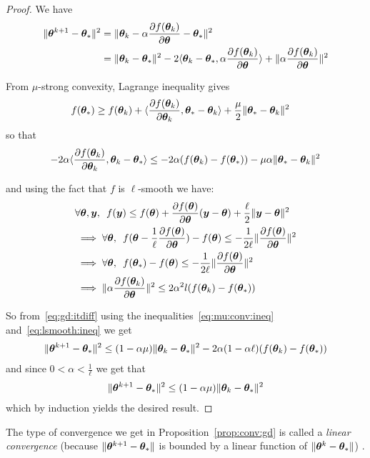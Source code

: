 \begin{proof}
  We have 
  \begin{align}
    \| \thetab^{k+1} - \thetab_* \|^2 &= \| \thetab_k -\alpha \partialfrac{\thetab}{f(\thetab_k)} - \thetab_* \|^2 \\
                            &= \| \thetab_k - \thetab_* \|^2  - 2 \dotp{ \thetab_k - \thetab_* }{ \alpha \partialfrac{\thetab}{f(\thetab_k)} } + \|\alpha \partialfrac{\thetab}{f(\thetab_k)} \|^2  \label{eq:gd:itdiff}
 \end{align}

 From $\mu$-strong convexity, Lagrange inequality gives
 \begin{align}
   &f(\thetab_*) \geq f(\thetab_k) + \dotp{ \partialfrac{\thetab_k}{f(\thetab_k)} }{ \thetab_* - \thetab_k } + \frac{\mu}{2} \|\thetab_* - \thetab_k \|^2
 \end{align}
 so that 
 \begin{align}
   -2 \alpha \dotp{ \partialfrac{\thetab_k}{f(\thetab_k)} }{ \thetab_k -  \thetab_*} \leq  -2 \alpha(f(\thetab_k) - f(\thetab_*)) - \mu \alpha \|\thetab_* - \thetab_k \|^2 \label{eq:mu:conv:ineq}
   \end{align}

   and using the fact that $f$ is $\ell$-smooth we have: 
   \begin{align}
     &\forall \thetab, \yb, \enspace f(\yb) \leq f(\thetab) + \partialfrac{\thetab}{f(\thetab)} (\yb - \thetab) + \frac{\ell}{2} \| \yb - \thetab \|^2 \\
     &\implies \forall \thetab, \enspace f(\thetab - \frac1{\ell} \partialfrac{\thetab}{f(\thetab)}) - f(\thetab) \leq -\frac1{2\ell} \| \partialfrac{\thetab}{f(\thetab)} \|^2 \\
     &\implies \forall \thetab, \enspace f(\thetab_*) - f(\thetab) \leq -\frac1{2\ell} \| \partialfrac{\thetab}{f(\thetab)} \|^2  \\
     &\implies \|\alpha \partialfrac{\thetab}{f(\thetab_k)} \|^2 \leq 2\alpha^2 l(f(\thetab_k) - f(\thetab_*)) \label{eq:lsmooth:ineq}
   \end{align}

   So from~\eqref{eq:gd:itdiff} using the inequalities~\eqref{eq:mu:conv:ineq}
   and~\eqref{eq:lsmooth:ineq} we get
   \begin{align}
     \| \thetab^{k+1} - \thetab_* \|^2 \leq (1 - \alpha \mu)\| \thetab_k - \thetab_* \|^2 -2 \alpha (1 - \alpha \ell) (f(\thetab_k) - f(\thetab_*))
   \end{align} 
   and since $0 < \alpha < \frac1{\ell}$ we get that 
   \begin{align}
     \| \thetab^{k+1} - \thetab_* \|^2 \leq (1 - \alpha \mu)\| \thetab_k - \thetab_* \|^2
   \end{align}
   which by induction yields the desired result.
\end{proof}
The type of convergence we get in Proposition~\ref{prop:conv:gd} is called a
\emph{linear convergence} (because $\| \thetab^{k+1} - \thetab_*
\|$ is bounded by a linear function of  $\|\thetab^{k} - \thetab_* \|$) .

